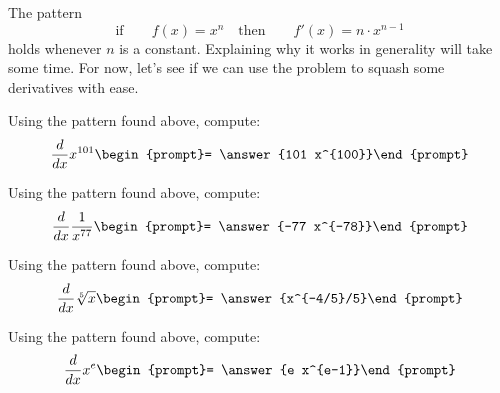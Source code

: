 \documentclass{ximera}
\begin{document}
The pattern
\[
  \text{if} \qquad f(x) = x^n\quad\text{then}\qquad f'(x) = n\cdot x^{n-1}
\]
holds whenever $n$ is a constant. Explaining why it works in
generality will take some time. For now, let's see if we can use the
problem to squash some derivatives with ease.

\begin{problem}
  Using the pattern found above, compute:
  \[
  \ddx x^{101} \begin{prompt}= \answer{101 x^{100}}\end{prompt}
  \]
\end{problem}

\begin{problem}
  Using the pattern found above, compute:
  \[
  \ddx \frac{1}{x^{77}} \begin{prompt}= \answer{-77 x^{-78}}\end{prompt}
  \]
\end{problem}


\begin{problem}
  Using the pattern found above, compute:
  \[
  \ddx \sqrt[5]{x} \begin{prompt}= \answer{x^{-4/5}/5}\end{prompt}
  \]
\end{problem}

\begin{problem}
  Using the pattern found above, compute:
  \[
  \ddx x^e  \begin{prompt}= \answer{e x^{e-1}}\end{prompt}
  \]
\end{problem}


\end{document}
